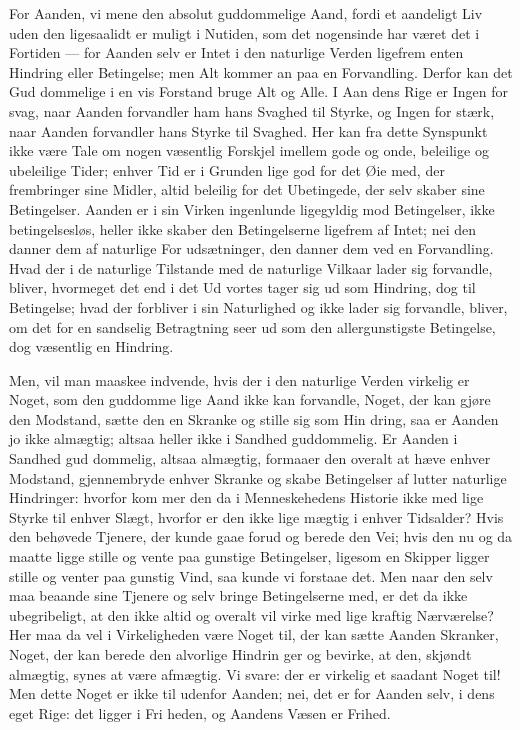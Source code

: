 \documentclass[12pt]{book}
\newcommand{\opage}[1]{\marginnote{\footnotesize\textit{[#1]}}}
\begin{document}
For Aanden, vi mene den absolut guddommelige
Aand, fordi et aandeligt Liv uden den ligesaalidt er
muligt i Nutiden, som det nogensinde har været det i
Fortiden --- for Aanden selv er Intet i den naturlige
\opage{8}\setcounter{footnote}{0}%
Verden ligefrem enten Hindring eller Betingelse; men Alt
kommer an paa en Forvandling. Derfor kan det Gud\-%
dommelige i en vis Forstand bruge Alt og Alle. I Aan\-%
dens Rige er Ingen for svag, naar Aanden forvandler
ham hans Svaghed til Styrke, og Ingen for stærk, naar
Aanden forvandler hans Styrke til Svaghed. Her kan
fra dette Synspunkt ikke være Tale om nogen væsentlig
Forskjel imellem gode og onde, beleilige og ubeleilige
Tider; enhver Tid er i Grunden lige god for det Øie\-%
med, der frembringer sine Midler, altid beleilig for det
Ubetingede, der selv skaber sine Betingelser. Aanden
er i sin Virken ingenlunde ligegyldig mod Betingelser,
ikke betingelsesløs, heller ikke skaber den Betingelserne
ligefrem af Intet; nei den danner dem af naturlige For\-%
udsætninger, den danner dem ved en Forvandling. Hvad
der i de naturlige Tilstande med de naturlige Vilkaar
lader sig forvandle, bliver, hvormeget det end i det Ud\-%
vortes tager sig ud som Hindring, dog til Betingelse;
hvad der forbliver i sin Naturlighed og ikke lader sig
forvandle, bliver, om det for en sandselig Betragtning
seer ud som den allergunstigste Betingelse, dog væsentlig
en Hindring.

Men, vil man maaskee indvende, hvis der i den
naturlige Verden virkelig er Noget, som den guddomme\-%
lige Aand ikke kan forvandle, Noget, der kan gjøre den
Modstand, sætte den en Skranke og stille sig som Hin\-%
dring, saa er Aanden jo ikke almægtig; altsaa heller ikke
i Sandhed guddommelig. Er Aanden i Sandhed gud\-%
dommelig, altsaa almægtig, formaaer den overalt at hæve
enhver Modstand, gjennembryde enhver Skranke og skabe
Betingelser af lutter naturlige Hindringer: hvorfor kom\-%
mer den da i Menneskehedens Historie ikke med lige
Styrke til enhver Slægt, hvorfor er den ikke lige mægtig
i enhver Tidsalder? Hvis den behøvede Tjenere, der
\opage{9}\setcounter{footnote}{0}%
kunde gaae forud og berede den Vei; hvis den nu og
da maatte ligge stille og vente paa gunstige Betingelser,
ligesom en Skipper ligger stille og venter paa gunstig
Vind, saa kunde vi forstaae det. Men naar den selv
maa beaande sine Tjenere og selv bringe Betingelserne
med, er det da ikke ubegribeligt, at den ikke altid og
overalt vil virke med lige kraftig Nærværelse? Her maa da
vel i Virkeligheden være Noget til, der kan sætte Aanden
Skranker, Noget, der kan berede den alvorlige Hindrin\-%
ger og bevirke, at den, skjøndt almægtig, synes at være
afmægtig. Vi svare: der er virkelig et saadant Noget
til! Men dette Noget er ikke til udenfor Aanden; nei,
det er for Aanden selv, i dens eget Rige: det ligger i Fri\-%
heden, og Aandens Væsen er Frihed.
\end{document}
